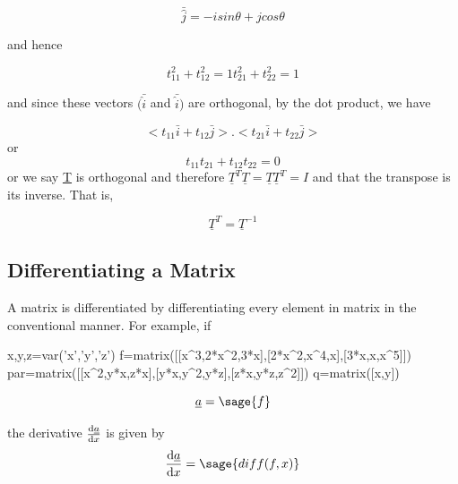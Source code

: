\documentclass[12pt]{report}
\begin{document}
\begin{equation}
	\bar{\hat{j}} =-isin\theta+jcos\theta
\end{equation}

and hence

\begin{equation}
	{t}^2_{11} + {t}^2_{12}=1 
	{t}^2_{21} + {t}^2_{22}=1
\end{equation}

and since these vectors $(\bar{\hat{i}}$ and $\bar{\hat{i}})$ are
orthogonal, by the dot product, we have


\begin{equation}
	<{t}_{11} \bar{i} + {t}_{12} \bar{j}>.<{t}_{21} \bar{i} +
	{t}_{22} \bar{j}>
\end{equation}
or 
\begin{equation}
		{t}_{11}{t}_{21} + {t}_{12} {t}_{22}=0
\end{equation}
or we say \underline{T} is orthogonal and 
therefore $\underline{T}^T\underline{T}=\underline{T}\underline{T}^T=I$ 
and that the transpose is its inverse. That is,

\begin{equation}
	\underline{T}^T=\underline{T}^{-1}
\end{equation}


\subsection{Differentiating a Matrix}

A matrix is differentiated by differentiating
 every element in matrix in the conventional 
manner. For example, if

\begin{sagesilent}
	x,y,z=var('x','y','z')
	f=matrix([[x^3,2*x^2,3*x],[2*x^2,x^4,x],[3*x,x,x^5]])
	par=matrix([[x^2,y*x,z*x],[y*x,y^2,y*z],[z*x,y*z,z^2]])
	q=matrix([x,y])
\end{sagesilent}

\begin{equation}
	\underline{a}= \sage{f}
\end{equation}

the derivative $\frac{{\rm d}\underline{a}}{{\rm d}x}$ 
is given by 
\begin{equation} 
	\frac{{\rm d}\underline{a}}{{\rm d}x} = \sage{diff(f,x)}
\end{equation}
\end{document}
